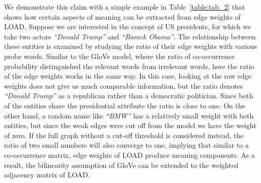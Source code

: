 We demonstrate this claim with a simple example in Table~\ref{table:tab_2} that shows how certain aspects of meaning can be extracted from edge weights of LOAD. Suppose we are interested in the concept of US presidents, for which we take two actors \emph{``Donald Trump''} and \emph{``Barack Obama''}. The relationship between these entities is examined by studying the ratio of their edge weights with various probe words. Similar to the GloVe model, where the ratio of co-occurrence probability distinguished the relevant words from irrelevant words, here the ratio of the edge weights works in the same way. In this case, looking at the raw edge weights does not give us much comparable information, but the ratio denotes \emph{``Donald Trump''} as a republican rather than a democratic politician. Since both of the entities share the presidential attribute the ratio is close to one. On the other hand, a random name like \emph{``BMW''} has a relatively small weight with both entities, but since the weak edges were cut off from the model we have the weight of zero. If  the full graph without a cut-off threshold is considered instead, the ratio of two small numbers will also converge to one, implying that similar to a co-occurrence matrix, edge weights of LOAD produce meaning components. As a result, the bilinearity assumption of GloVe can be extended to the weighted adjacency matrix of LOAD. 

